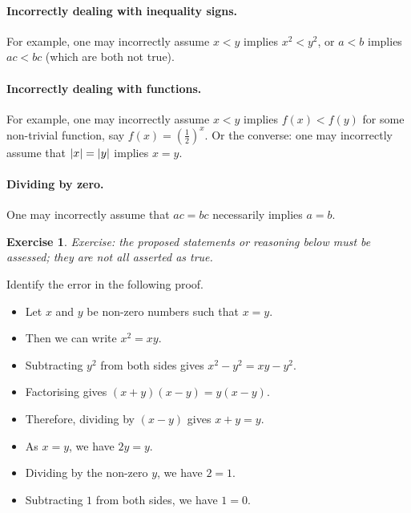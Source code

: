 \documentclass[11pt]{article}
\theoremstyle{definition}
\newtheorem{example}[theorem]{Exercise}
\theoremstyle{remark}
\newcommand{\pqty}[1]{\left(#1\right)}
\DeclarePairedDelimiter{\abs}{\lvert}{\rvert}
\newcommand{\flatfrac}[2]{\frac{#1}{#2}}
\begin{document}
\paragraph{Incorrectly dealing with inequality signs.} For example, one may incorrectly assume \(x < y\) implies \(x^2 < y^2\), or \(a < b\) implies \(ac < bc\) (which are both not true).

\paragraph{Incorrectly dealing with functions.} For example, one may incorrectly assume \(x < y\) implies \(f\pqty{x} < f\pqty{y}\) for some non-trivial function, say \(f\pqty{x} = \pqty{\flatfrac{1}{2}}^x\). Or the converse: one may incorrectly assume that \(\abs{x} = \abs{y}\) implies \(x = y\).

\paragraph{Dividing by zero.} One may incorrectly assume that \(ac = bc\) necessarily implies \(a = b\).

\begin{example}\label{tmua-6-unit-025}
\textit{Exercise: the proposed statements or reasoning below must be assessed; they are not all asserted as true.}\par

    Identify the error in the following proof.

    \begin{itemize}
        \item Let \(x\) and \(y\) be non-zero numbers such that \(x = y\).
        \item Then we can write \(x^2 = xy\).
        \item Subtracting \(y^2\) from both sides gives \(x^2 - y^2 = xy - y^2\).
        \item Factorising gives \(\pqty{x + y} \pqty{x - y} = y \pqty{x - y}\).
        \item Therefore, dividing by \(\pqty{x - y}\) gives \(x + y = y\).
        \item As \(x = y\), we have \(2y = y\).
        \item Dividing by the non-zero \(y\), we have \(2 = 1\).
        \item Subtracting \(1\) from both sides, we have \(1 = 0\).
    \end{itemize}
\end{example}
\end{document}
